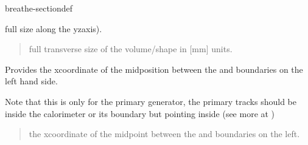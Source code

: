 \documentclass[letterpaper,10pt,english]{sphinxmanual}
\begin{document}
\begin{fulllineitems}
\begin{sphinxuseclass}{breathe-sectiondef}
\begin{fulllineitems}
\sphinxAtStartPar
full size along the yz\sphinxhyphen{}axis). \begin{quote}\begin{description}
\sphinxAtStartPar
full transverse size of the  volume/shape in {[}mm{]} units. 

\end{description}\end{quote}


\end{fulllineitems}


\begin{fulllineitems}
\label{\detokenize{Simulation/SimulationCodeDoc:_CPPv4NK8Geometry19GetPrimaryXpositionEv}}
\pysigstartsignatures
\pysigstartmultiline
{}
\pysigstopmultiline
\pysigstopsignatures
\sphinxAtStartPar
Provides the x\sphinxhyphen{}coordinate of the mid\sphinxhyphen{}position between the  and  boundaries on the left hand side. 

\sphinxAtStartPar
Note that this is only for the primary generator, the primary tracks should be inside the calorimeter or its boundary but pointing inside (see more at )

\sphinxAtStartPar
\begin{quote}\begin{description}
\sphinxAtStartPar
the x\sphinxhyphen{}coordinate of the mid\sphinxhyphen{}point between the  and  boundaries on the left. 

\end{description}\end{quote}


\end{fulllineitems}


\end{sphinxuseclass}
\end{fulllineitems}
\end{document}
